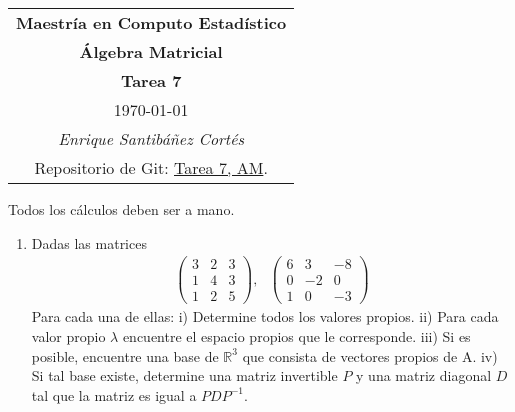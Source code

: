 \documentclass[11pt,letterpaper]{article}
\newcommand{\mR}{\mathbb{R}}
\begin{document}
\begin{table}[ht]
\centering
\begin{tabular}{c}
\textbf{Maestría en Computo Estadístico}\\
\textbf{Álgebra Matricial} \\
\textbf{Tarea 7}\\
\today \\
\emph{Enrique Santibáñez Cortés}\\
Repositorio de Git: \href{https://github.com/Enriquesec/Algebra_matricial/tree/master/tareas/Tarea_7}{Tarea 7, AM}.
\end{tabular}
\end{table}
Todos los cálculos deben ser a mano.
\begin{enumerate}
\item Dadas las matrices 
\begin{align*}
\begin{pmatrix}
3 & 2 & 3\\
1 & 4 & 3\\
1 & 2 & 5
\end{pmatrix}, \ \ \ \begin{pmatrix}
6 & 3 & -8\\
0 &-2 & 0\\
1 & 0 &-3
\end{pmatrix}
\end{align*}
Para cada una de ellas: i) Determine todos los valores propios. ii) Para cada valor propio $\lambda$ encuentre el espacio propios que le corresponde. iii) Si es posible,
encuentre una base de $\mR^3$ que consista de vectores propios de A. iv) Si tal base existe, determine una matriz invertible $P$ y una matriz diagonal $D$ tal que la matriz es igual a $P DP^{-1}$.


\end{enumerate}
\end{document}
